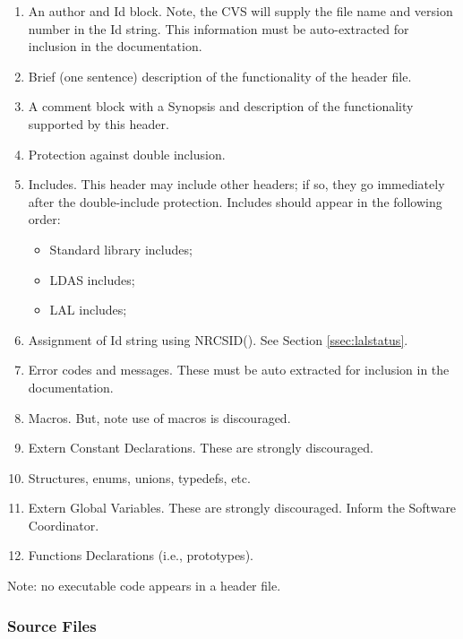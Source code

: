 \documentclass[]{ligodcc}
\begin{document}
\begin{enumerate}
\item
An author and Id block. Note, the CVS will supply the file name and
version number in the Id string. This information must be
auto-extracted for inclusion in the documentation.

\item
Brief (one sentence) description of the functionality of the header
file.

\item
A comment block with a Synopsis and description of the functionality
supported by this header.

\item
Protection against double inclusion.

\item
Includes. This header may include other headers; if so, they
go immediately after the double-include protection. Includes should
appear in the following order:
\begin{itemize}
    \item Standard library includes;
    \item LDAS includes;
    \item LAL includes;
\end{itemize}


\item 
Assignment of Id string using NRCSID().  See Section
\ref{ssec:lalstatus}.
\item 
Error codes and messages.  These must be auto extracted for
inclusion in the documentation.
\item
Macros. But, note use of macros is discouraged.
\item
Extern Constant Declarations. These are strongly discouraged.
\item
Structures, enums, unions,  typedefs, etc.
\item
Extern Global Variables. These are strongly discouraged.
Inform the Software Coordinator.
\item
Functions Declarations (i.e., prototypes).

\end{enumerate}

\noindent
Note: no executable code appears in a header file.

\subsubsection{Source Files}
\end{document}
